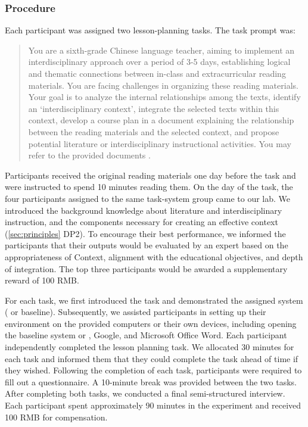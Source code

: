 \subsubsection{Procedure}
Each participant was assigned two lesson-planning tasks.  
The task prompt was: 
\begin{quote}
    You are a sixth-grade Chinese language teacher, aiming to implement an interdisciplinary approach over a period of 3-5 days, establishing logical and thematic connections between in-class and extracurricular reading materials. You are facing challenges in organizing these reading materials. Your goal is to analyze the internal relationships among the texts, identify an `interdisciplinary context', integrate the selected texts within this context, develop a course plan in a document explaining the relationship between the reading materials and the selected context, and propose potential literature or interdisciplinary instructional activities. 
    You may refer to the provided documents . 
\end{quote}

Participants received the original reading materials one day before the task and were instructed to spend 10 minutes reading them.
On the day of the task, the four participants assigned to the same task-system group came to our lab. 
We introduced the background knowledge about literature and interdisciplinary instruction, and the components necessary for creating an effective context (\ref{sec:principles} DP2).
To encourage their best performance, we informed the participants that their outputs would be evaluated by an expert based on the appropriateness of Context, alignment with the educational objectives, and depth of integration. The top three participants would be awarded a supplementary reward of 100 RMB.

For each task, we first introduced the task and demonstrated the assigned system (\name{} or baseline).
Subsequently, we assisted participants in setting up their  environment on the provided computers or their own devices, including opening the baseline system or \name{}, Google, and Microsoft Office Word. %
Each participant independently completed the lesson planning task. 
We allocated 30 minutes for each task and informed them that they could complete the task ahead of time if they wished. 
Following the completion of each task, participants were required to fill out a questionnaire. A 10-minute break was provided between the two tasks.  %
After completing both tasks, we conducted a final semi-structured interview. Each participant spent approximately 90 minutes in the experiment and received 100 RMB for compensation.

